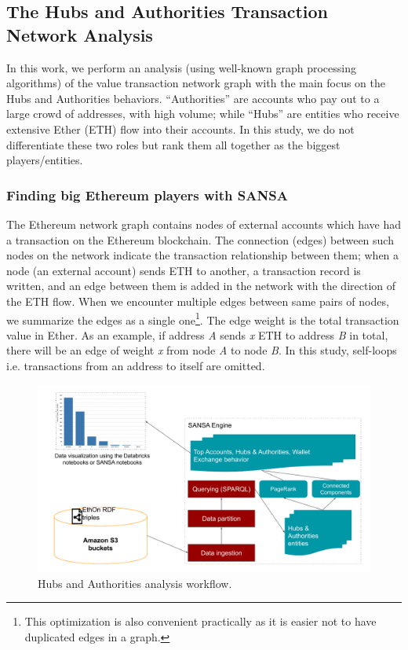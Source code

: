 \subsection{The Hubs and Authorities Transaction Network Analysis}
\label{sec:the-hub-and-authorities-use-case}
In this work, we perform an analysis (using well-known graph processing algorithms) of the value transaction network graph with the main focus on the Hubs and Authorities behaviors.
``Authorities'' are accounts who pay out to a large crowd of addresses, with high volume; while ``Hubs'' are entities who receive extensive Ether (ETH) flow into their accounts.
In this study, we do not differentiate these two roles but rank them all together as the biggest players/entities.

\subsubsection{Finding big Ethereum players with SANSA}
The Ethereum network graph contains nodes of external accounts which have had a transaction on the Ethereum blockchain.
The connection (edges) between such nodes on the network indicate the transaction relationship between them; when a node (an external account) sends ETH to another, a transaction record is written, and an edge between them is added in the network with the direction of the ETH flow. When we encounter multiple edges between same pairs of nodes, we summarize the edges as a single one\footnote{This optimization is also convenient practically as it is easier not to have duplicated edges in a graph.}. The edge weight is the total transaction value in Ether.
As an example, if address \emph{A} sends \emph{x} ETH to address \emph{B} in total, there will be an edge of weight \emph{x} from node \emph{A} to node \emph{B}. 
In this study, self-loops i.e. transactions from an address to itself are omitted.

\begin{figure}
\centering
\includegraphics[width=1.0\columnwidth]{images/7_implemenation_and_usecases/hub-and-authorities-system-architecture.pdf}
\caption{Hubs and Authorities analysis workflow.}
\label{fig:hub-and-authorities-system-architecture}
\end{figure}


